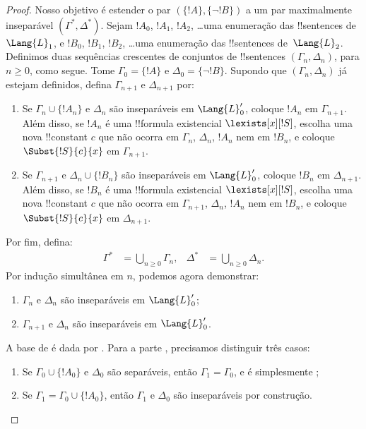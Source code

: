 \documentclass[../../../include/open-logic-section]{subfiles}
\begin{document}
\begin{proof}
Nosso objetivo é estender o par $(\{ !A \}, \{\lnot!B\})$ a um par
maximalmente inseparável $(\Gamma^*, \Delta^*)$. Sejam $!A_0$, $!A_1$,
$!A_2$, \dots uma enumeração das !!{sentence}s de $\Lang{L}_1$, e
$!B_0$, $!B_1$, $!B_2$, \dots uma enumeração das !!{sentence}s
de~$\Lang{L}_2$. Definimos duas sequências crescentes de conjuntos de
!!{sentence}s $(\Gamma_n, \Delta_n)$, para $n \ge 0$, como segue.
Tome $\Gamma_0 = \{ !A\}$ e $\Delta_0 = \{\lnot !B \}$. Supondo que
$(\Gamma_n, \Delta_n)$ já estejam definidos, defina $\Gamma_{n+1}$ e
$\Delta_{n+1}$ por:
\begin{enumerate}
\item Se $\Gamma_n \cup \{!A_n \}$ e $\Delta_n$ são inseparáveis em
  $\Lang{L}'_0$, coloque $!A_n$ em $\Gamma_{n+1}$. Além disso, se
  $!A_n$ é uma !!{formula} existencial $\lexists[x][!S]$, escolha uma
  nova !!{constant} $c$ que não ocorra em $\Gamma_n$, $\Delta_n$,
  $!A_n$ nem em $!B_n$, e coloque $\Subst{!S}{c}{x}$ em
  $\Gamma_{n+1}$.
\item Se $\Gamma_{n+1}$ e $\Delta_n \cup \{!B_n \}$ são inseparáveis
  em $\Lang{L}'_0$, coloque $!B_n$ em $\Delta_{n+1}$. Além disso, se
  $!B_n$ é uma !!{formula} existencial $\lexists[x][!S]$, escolha uma
  nova !!{constant} $c$ que não ocorra em $\Gamma_{n+1}$, $\Delta_n$,
  $!A_n$ nem em $!B_n$, e coloque $\Subst{!S}{c}{x}$ em
  $\Delta_{n+1}$.
\end{enumerate}
Por fim, defina:
\begin{align*}
  \Gamma^* & = \bigcup_{n\ge 0} \Gamma_n, & 
  \Delta^* & = \bigcup_{n\ge 0} \Delta_n.
\end{align*}
Por indução simultânea em $n$, podemos agora demonstrar:
\begin{enumerate}
\item{} $\Gamma_n$ e $\Delta_n$ são inseparáveis em
  $\Lang{L}'_0$;
\item{} $\Gamma_{n+1}$ e $\Delta_n$ são inseparáveis em
    $\Lang{L}'_0$.
\end{enumerate}
A base de  é dada por . Para a parte
, precisamos distinguir três casos:
\begin{enumerate}
\item Se $\Gamma_0 \cup \{!A_0 \}$ e $\Delta_0$ são separáveis, então
  $\Gamma_1 = \Gamma_0$, e  é simplesmente
  ;
\item Se $\Gamma_1 = \Gamma_0 \cup\{ !A_0\}$, então $\Gamma_1$ e
  $\Delta_0$ são inseparáveis por construção.

\end{enumerate}
\end{proof}
\end{document}
